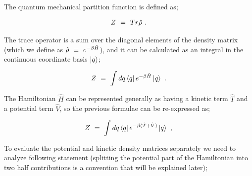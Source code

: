 \documentclass{article}
\newcounter{subsubsubsection}[subsubsection]
\begin{document}
The quantum mechanical partition function is defined as;

\begin{equation} \label{eb-eq-1-182}
Z \hspace{0.125cm} = \hspace{0.125cm} Tr\hat{\rho} \hspace{0.125cm} .
\end{equation}

The trace operator is a sum over the diagonal elements of the density matrix (which we define as \begin{math} \hat{\rho} \hspace{0.125cm} \equiv \hspace{0.125cm} e^{-\beta \hat{H}} \end{math}), and it can be calculated as an integral in the continuous coordinate basis \begin{math} \ket{q} \end{math};

\begin{equation} \label{eb-eq-1-183}
Z \hspace{0.125cm} = \hspace{0.125cm} \int dq \bra{q} e^{-\beta \hat{H}} \ket{q} \hspace{0.125cm} .
\end{equation}

The Hamiltonian \begin{math} \hat{H} \end{math} can be represented generally as having a kinetic term \begin{math} \hat{T} \end{math} and a potential term \begin{math} \hat{V} \end{math}, so the previous formulae can be re-expressed as;

\begin{equation} \label{eb-eq-1-184}
Z  \hspace{0.125cm} = \hspace{0.125cm} \int dq \bra{q} e^{-\beta ( \hat{T} + \hat{V} )}\ket{q} \hspace{0.125cm} , 
\end{equation}

To evaluate the potential and kinetic density matrices separately we need to analyze following statement (splitting the potential part of the Hamiltonian into two half contributions is a convention that will be explained later); 
\end{document}
